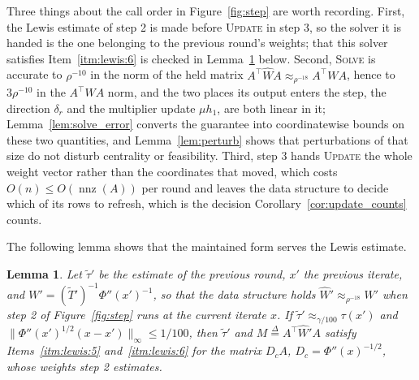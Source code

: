 \documentclass[11pt]{article}
\newtheorem{lemma}{Lemma}[section]
\newcommand{\nnz}{\operatorname{nnz}}
\newcommand{\tautil}{\widetilde{\tau}}
\newcommand{\defeq}{\stackrel{\Delta}{=}}
\begin{document}
Three things about the call order in Figure~\ref{fig:step} are worth recording.
First, the Lewis estimate of step 2 is made before \textsc{Update} in step 3, so
the solver it is handed is the one belonging to the previous round's weights;
that this solver satisfies Item~\ref{itm:lewis:6} is checked in
Lemma~\ref{lem:solver_form} below.
Second, \textsc{Solve} is accurate to $\rho^{-10}$ in the norm of the held
matrix $A^\top \widehat W A \approx_{\rho^{-18}} A^\top W A$, hence to
$3 \rho^{-10}$ in the
$A^\top W A$ norm, and the two places its output enters the step, the direction
$\delta_r$ and the multiplier update
$\mu h_1$, are both linear in it; Lemma~\ref{lem:solve_error} converts the
guarantee into coordinatewise bounds on these two quantities, and
Lemma~\ref{lem:perturb} shows that perturbations of that size do not disturb
centrality or feasibility.
Third, step 3 hands \textsc{Update} the whole weight vector rather than the
coordinates that moved, which costs $O(n) \le O(\nnz(A))$ per round and leaves
the data structure to decide which of its rows to refresh, which is the decision
Corollary~\ref{cor:update_counts} counts.

The following lemma shows that the maintained form serves the Lewis estimate.

\begin{lemma}
\label{lem:solver_form}
Let $\tautil'$ be the estimate of the previous round,
$x'$ the previous iterate, and
$W' = (\widetilde{T}')^{-1} \Phi''(x')^{-1}$, so that the data structure holds
$\widehat W' \approx_{\rho^{-18}} W'$ when step 2 of Figure~\ref{fig:step} runs
at the current iterate $x$.
If $\tautil' \approx_{\gamma / 100} \tau(x')$ and
$\|\Phi''(x')^{1/2} (x - x')\|_{\infty} \le 1 / 100$, then
$\tautil'$ and
$M \defeq A^\top \widehat W' A$ satisfy Items~\ref{itm:lewis:5}
and~\ref{itm:lewis:6} for the matrix $D_c A$,
$D_c = \Phi''(x)^{-1/2}$, whose weights step 2 estimates.
\end{lemma}
\end{document}
